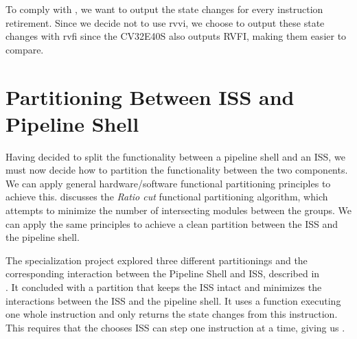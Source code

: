 To comply with , we want to output the state changes for every instruction retirement. Since we decide not to use \acrshort{rvvi}, we choose to output these state changes with \acrshort{rvfi} since the CV32E40S also outputs RVFI, making them easier to compare.

%


\section{Partitioning Between ISS and Pipeline Shell}

Having decided to split the functionality between a pipeline shell and an ISS, we must now decide how to partition the functionality between the two components. We can apply general hardware/software functional partitioning principles to achieve this. 
\textcite{gajskiSpecificationDesignEmbedded1994} discusses the \textit{Ratio cut} functional partitioning algorithm, which attempts to minimize the number of intersecting modules between the groups. We can apply the same principles to achieve a clean partition between the ISS and the pipeline shell.

\begin{sloppy}
The specialization project explored three different partitionings and the corresponding interaction between the Pipeline Shell and ISS, described in \\. It concluded with a partition that keeps the ISS intact and minimizes the interactions between the ISS and the pipeline shell. It uses a  function executing one whole instruction and only returns the state changes from this instruction. This requires that the chooses ISS can step one instruction at a time, giving us .
\end{sloppy}

